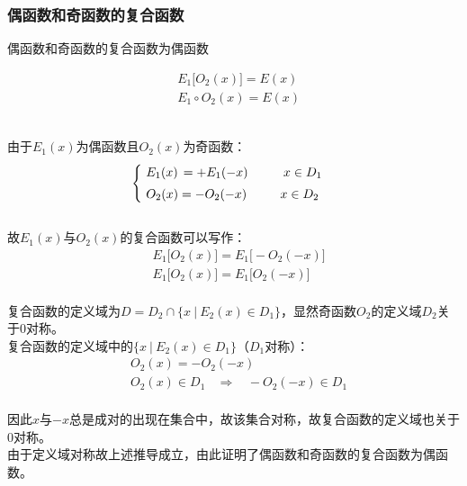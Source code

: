 \documentclass[UTF8]{ctexart}
\begin{document}
\subsubsection{偶函数和奇函数的复合函数}
    \setcounter{equation}{0}
    偶函数和奇函数的复合函数为偶函数
    \begin{large}
        \begin{align*}
            &E_1\big[O_2(x)\big]=E(x)\\[3mm]
            &E_1\circ O_2(x)=E(x)
        \end{align*}
    \end{large}\\
    由于$E_1(x)$为偶函数且$O_2(x)$为奇函数：
    \begin{align}
        \begin{cases}
            ~E_1(x)\hspace{1.5pt}=+E_1(-x)\hspace{1.5pt}~~~~~~~~x\in D_1\\[1mm]
            ~O_2(x)=-O_2(-x)~~~~~~~~x\in D_2
        \end{cases}
    \end{align}\\
    故$E_1(x)$与$O_2(x)$的复合函数可以写作：
    \begin{align}
        &E_1\big[O_2(x)\big]=E_1\big[-O_2(-x)\big]\\[3mm]
        &E_1\big[O_2(x)\big]=E_1\big[O_2(-x)\big]
    \end{align}\\
    复合函数的定义域为$D=D_2\cap\big\{x~|~E_2(x)\in D_1\big\}$，显然奇函数$O_2$的定义域$D_2$关于$0$对称。\\[3mm]
    复合函数的定义域中的$\big\{x~|~E_2(x)\in D_1\big\}$（$D_1$对称）：\vspace{5pt}
    \begin{align}
        &O_2(x)=-O_2(-x)\\[3mm]
        &O_2(x)\in D_1~~~~\Longrightarrow~~~~-O_2(-x)\in D_1
    \end{align}\\
    因此$x$与$-x$总是成对的出现在集合中，故该集合对称，故复合函数的定义域也关于$0$对称。\\[3mm]
    由于定义域对称故上述推导成立，由此证明了偶函数和奇函数的复合函数为偶函数。\vspace{8pt}

\newpage
\end{document}
